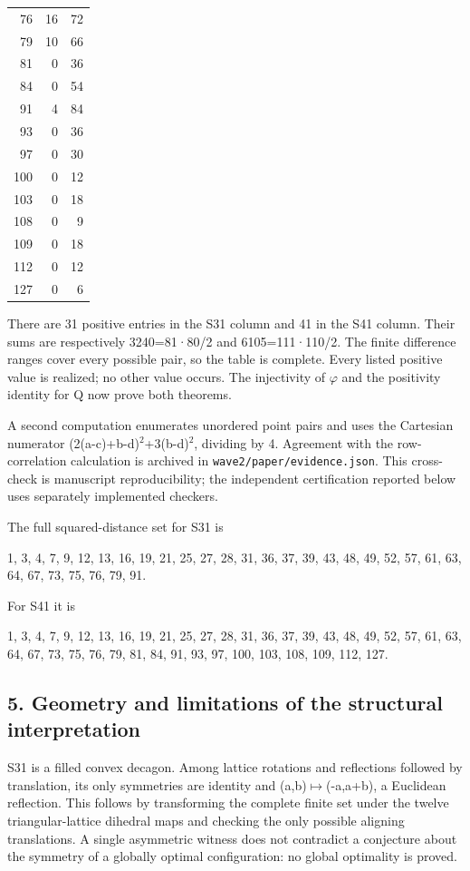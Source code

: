 \documentclass[
]{article}
\begin{document}
\begin{longtable}[]{@{}rrr@{}}
76 & 16 & 72 \\
79 & 10 & 66 \\
81 & 0 & 36 \\
84 & 0 & 54 \\
91 & 4 & 84 \\
93 & 0 & 36 \\
97 & 0 & 30 \\
100 & 0 & 12 \\
103 & 0 & 18 \\
108 & 0 & 9 \\
109 & 0 & 18 \\
112 & 0 & 12 \\
127 & 0 & 6 \\
\end{longtable}

There are 31 positive entries in the S31 column and 41 in the S41
column. Their sums are respectively 3240=81·80/2 and 6105=111·110/2. The
finite difference ranges cover every possible pair, so the table is
complete. Every listed positive value is realized; no other value
occurs. The injectivity of \ensuremath{\varphi} and the positivity identity for Q now prove
both theorems.

A second computation enumerates unordered point pairs and uses the
Cartesian numerator (2(a-c)+b-d)\ensuremath{{}^2}+3(b-d)\ensuremath{{}^2}, dividing by 4. Agreement with
the row-correlation calculation is archived in
\texttt{wave2/paper/evidence.json}. This cross-check is manuscript
reproducibility; the independent certification reported below uses
separately implemented checkers.

The full squared-distance set for S31 is

1, 3, 4, 7, 9, 12, 13, 16, 19, 21, 25, 27, 28, 31, 36, 37, 39, 43, 48,
49, 52, 57, 61, 63, 64, 67, 73, 75, 76, 79, 91.

For S41 it is

1, 3, 4, 7, 9, 12, 13, 16, 19, 21, 25, 27, 28, 31, 36, 37, 39, 43, 48,
49, 52, 57, 61, 63, 64, 67, 73, 75, 76, 79, 81, 84, 91, 93, 97, 100,
103, 108, 109, 112, 127.

\subsection{5. Geometry and limitations of the structural
interpretation}\label{geometry-and-limitations-of-the-structural-interpretation}

S31 is a filled convex decagon. Among lattice rotations and reflections
followed by translation, its only symmetries are identity and
(a,b)\ensuremath{\mapsto}(-a,a+b), a Euclidean reflection. This follows by transforming the
complete finite set under the twelve triangular-lattice dihedral maps
and checking the only possible aligning translations. A single
asymmetric witness does not contradict a conjecture about the symmetry
of a globally optimal configuration: no global optimality is proved.
\end{document}

